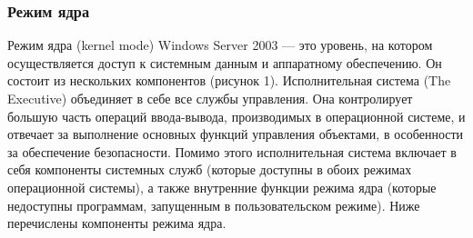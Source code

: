\subsubsection{Режим ядра}
Режим ядра (kernel mode) Windows Server 2003 — это уровень, на котором осуществляется доступ к системным данным и аппаратному обеспечению. Он состоит из нескольких компонентов (рисунок 1).
Исполнительная система (The Executive) объединяет в себе все службы управления. Она контролирует большую часть операций ввода-вывода, производимых в операционной системе, и отвечает за выполнение основных функций управления объектами, в особенности за обеспечение безопасности. Помимо этого исполнительная система включает в себя компоненты системных служб (которые доступны в обоих режимах операционной системы), а также внутренние функции режима ядра (которые недоступны программам, запущенным в пользовательском режиме). Ниже перечислены компоненты режима ядра.
